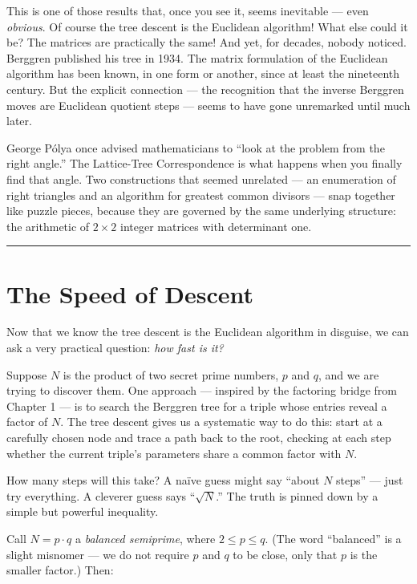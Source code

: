 This is one of those results that, once you see it, seems inevitable --- even \emph{obvious}. Of course the tree descent is the Euclidean algorithm! What else could it be? The matrices are practically the same! And yet, for decades, nobody noticed. Berggren published his tree in 1934. The matrix formulation of the Euclidean algorithm has been known, in one form or another, since at least the nineteenth century. But the explicit connection --- the recognition that the inverse Berggren moves are Euclidean quotient steps --- seems to have gone unremarked until much later.

George Pólya once advised mathematicians to ``look at the problem from the right angle.'' The Lattice-Tree Correspondence is what happens when you finally find that angle. Two constructions that seemed unrelated --- an enumeration of right triangles and an algorithm for greatest common divisors --- snap together like puzzle pieces, because they are governed by the same underlying structure: the arithmetic of \(2 \times 2\) integer matrices with determinant one.

\bigskip\noindent\rule{\linewidth}{0.4pt}\bigskip

\section{The Speed of Descent}
Now that we know the tree descent is the Euclidean algorithm in disguise, we can ask a very practical question: \emph{how fast is it?}

Suppose \(N\) is the product of two secret prime numbers, \(p\) and \(q\), and we are trying to discover them. One approach --- inspired by the factoring bridge from Chapter 1 --- is to search the Berggren tree for a triple whose entries reveal a factor of \(N\). The tree descent gives us a systematic way to do this: start at a carefully chosen node and trace a path back to the root, checking at each step whether the current triple's parameters share a common factor with \(N\).

How many steps will this take? A naïve guess might say ``about \(N\) steps'' --- just try everything. A cleverer guess says ``\(\sqrt{N}\).'' The truth is pinned down by a simple but powerful inequality.

Call \(N = p \cdot q\) a \emph{balanced semiprime}, where \(2 \le p \le q\). (The word ``balanced'' is a slight misnomer --- we do not require \(p\) and \(q\) to be close, only that \(p\) is the smaller factor.) Then:

